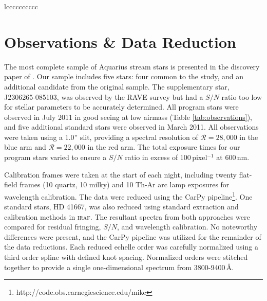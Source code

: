 \documentclass{emulateapj}
\begin{document}
\begin{deluxetable*}{lcccccccccc}


\enddata
{}
\end{deluxetable*}


\section{Observations \& Data Reduction}

The most complete sample of Aquarius stream stars is presented in the discovery paper of \citet{williams;et-al_2011}. Our sample includes five stars: four common to the \citet{wylie-de-boer;et-al_2012} study, and an additional candidate from the original \citet{williams;et-al_2011} sample. The supplementary star, J2306265-085103, was observed by the RAVE survey but had a $S/N$ ratio too low for stellar parameters to be accurately determined. All program stars were observed in July 2011 in good seeing at low airmass (Table \ref{tab:observations}), and five additional standard stars were observed in March 2011. All observations were taken using a 1.0'' slit, providing a spectral resolution of $\mathcal{R} = 28,000$ in the blue arm and $\mathcal{R} = 22,000$ in the red arm. The total exposure times for our program stars varied to ensure a $S/N$ ratio in excess of 100\,pixel$^{-1}$ at 600\,nm.

Calibration frames were taken at the start of each night, including twenty flat-field frames (10 quartz, 10 milky) and 10 Th-Ar arc lamp exposures for wavelength calibration. The data were reduced using the CarPy pipeline\footnote{http://code.obs.carnegiescience.edu/mike}. One standard stars, HD 41667, was also reduced using standard extraction and calibration methods in \textsc{iraf}. The resultant spectra from both approaches were compared for residual fringing, $S/N$, and wavelength calibration. No noteworthy differences were present, and the CarPy pipeline was utilized for the remainder of the data reductions. Each reduced echelle order was carefully normalized using a third order spline with defined knot spacing. Normalized orders were stitched together to provide a single one-dimensional spectrum from 3800-9400\,\AA{}. 
 
\end{document}
